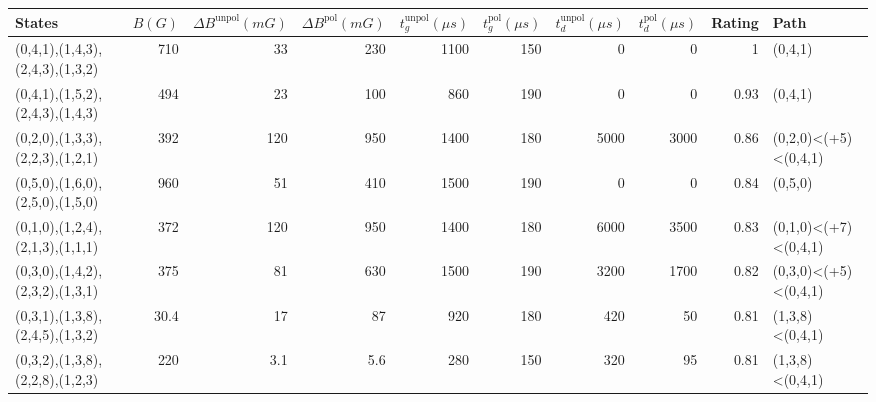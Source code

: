\begin{tabular}{lrrrrrrrrl}
\hline
 {States}                        &   {$B(G)$} &   {$\Delta B^{\text{unpol}}(mG)$} &   {$\Delta B^{\text{pol}}(mG)$} &   {$t^{\text{unpol}}_{g}(\mu s)$} &   {$t^{\text{pol}}_{g}(\mu s)$} &   {$t^{\text{unpol}}_{d}(\mu s)$} &   {$t^{\text{pol}}_{d}(\mu s)$} &   {Rating} & {Path}               \\
\hline
 (0,4,1),(1,4,3),(2,4,3),(1,3,2) &      710   &                              33   &                           230   &                              1100 &                             150 &                                 0 &                               0 &       1    & (0,4,1)              \\
 (0,4,1),(1,5,2),(2,4,3),(1,4,3) &      494   &                              23   &                           100   &                               860 &                             190 &                                 0 &                               0 &       0.93 & (0,4,1)              \\
 (0,2,0),(1,3,3),(2,2,3),(1,2,1) &      392   &                             120   &                           950   &                              1400 &                             180 &                              5000 &                            3000 &       0.86 & (0,2,0)<(+5)<(0,4,1) \\
 (0,5,0),(1,6,0),(2,5,0),(1,5,0) &      960   &                              51   &                           410   &                              1500 &                             190 &                                 0 &                               0 &       0.84 & (0,5,0)              \\
 (0,1,0),(1,2,4),(2,1,3),(1,1,1) &      372   &                             120   &                           950   &                              1400 &                             180 &                              6000 &                            3500 &       0.83 & (0,1,0)<(+7)<(0,4,1) \\
 (0,3,0),(1,4,2),(2,3,2),(1,3,1) &      375   &                              81   &                           630   &                              1500 &                             190 &                              3200 &                            1700 &       0.82 & (0,3,0)<(+5)<(0,4,1) \\
 (0,3,1),(1,3,8),(2,4,5),(1,3,2) &       30.4 &                              17   &                            87   &                               920 &                             180 &                               420 &                              50 &       0.81 & (1,3,8)<(0,4,1)      \\
 (0,3,2),(1,3,8),(2,2,8),(1,2,3) &      220   &                               3.1 &                             5.6 &                               280 &                             150 &                               320 &                              95 &       0.81 & (1,3,8)<(0,4,1)      \\
\hline
\end{tabular}